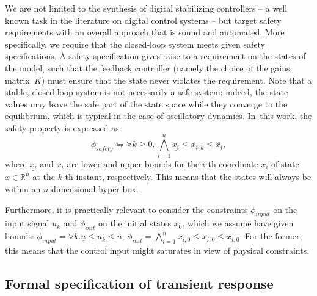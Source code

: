 \documentclass[twocolumn]{autart}    %
\begin{document}
We are not limited to the synthesis of digital stabilizing controllers -- a
well known task in the literature on digital control systems -- but target
safety requirements with an overall approach that is sound and automated. 
More specifically, we require that the closed-loop system
 meets given safety specifications.  A safety
specification gives raise to a requirement on the states of the model, such
that the feedback controller (namely the choice of the gains matrix~$K$)
must ensure that the state never violates the requirement.  Note that a
stable, closed-loop system is not necessarily a safe system: indeed, the
state values may leave the safe part of the state space while they converge
to the equilibrium, which is typical in the case of oscillatory dynamics. 
In~this work, the safety property is expressed as:
%
\begin{equation}
\label{eq:safetyliteral}
\phi_\mathit{safety}\iff \forall k\ge 0.\, \bigwedge_{i=1}^{n}{\underline{x_{i}} \leq x_{i,k} \leq \overline{x_{i}}},
\end{equation}
%
%
where $\underline{x_{i}}$ and $\overline{x_{i}}$ are lower and upper bounds
for the $i$-th coordinate $x_{i}$ of state $x\in \mathbb R^n$ at the $k$-th
instant, respectively.  This means that the states will always be within an $n$-dimensional hyper-box.

Furthermore, it is practically relevant to consider the 
constraints $\phi_\mathit{input}$ on the input
signal $u_{k}$ and $\phi_\mathit{init}$ on the initial states $x_0$,
which we assume have given bounds:
$\phi_\mathit{input} = {\forall k.\underline{u} \leq u_{k} \leq \overline{u}} $, 
$\phi_\mathit{init} = \bigwedge_{i=1}^{n} \underline{x_{i,0}} \leq x_{i,0} \leq \overline{x_{i,0}}.$
For the former, this means that the control input might saturates in view of
physical constraints.

\subsection{Formal specification of transient response} 
\label{ssec:transientspecification}
\end{document}
